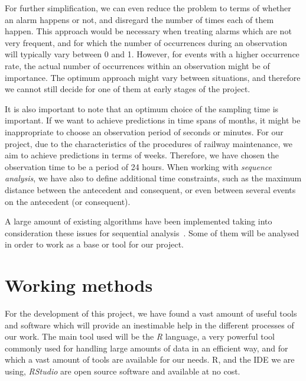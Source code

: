 \documentclass[a4paper,12pt]{article}
\begin{document}
For further simplification, we can even reduce the problem to terms of whether an alarm happens or not, and disregard the number of times each of them happen. This approach would be necessary when treating alarms which are not very frequent, and for which the number of occurrences during an observation will typically vary between 0 and 1. However, for events with a higher occurrence rate, the actual number of occurrences within an observation might be of importance. The optimum approach might vary between situations, and therefore we cannot still decide for one of them at early stages of the project.

It is also important to note that an optimum choice of the sampling time is important. If we want to achieve predictions in time spans of months, it might be inappropriate to choose an observation period of seconds or minutes. For our project, due to the characteristics of the procedures of railway maintenance, we aim to achieve predictions in terms of weeks. Therefore, we have chosen the observation time to be a period of 24 hours. When working with \emph{sequence analysis}, we have also to define additional time constraints\cite{suh2011practical}, such as the maximum distance between the antecedent and consequent, or even between several events on the antecedent (or consequent).

A large amount of existing algorithms have been implemented taking into consideration these issues for sequential analysis~\cite{wu2010sequential}. Some of them will be analysed in order to work as a base or tool for our project.

\section{Working methods} \label{sec:methods}
For the development of this project, we have found a vast amount of useful tools and software which will provide an inestimable help in the different processes of our work. The main tool used will be the \emph{R} language\cite{ihaka1996r}, a very powerful tool commonly used for handling large amounts of data in an efficient way, and for which a vast amount of tools are available for our needs. R, and the IDE we are using, \emph{RStudio}\cite{racine2012rstudio} are open source software and available at no cost.
\end{document}
